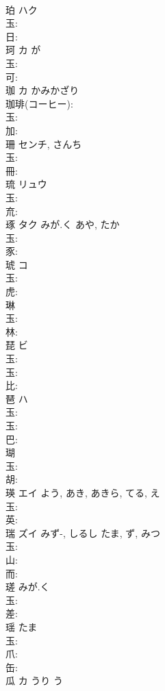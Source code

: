 \documentclass[8pt]{extreport}
\begin{document}
\begin{CJK}{UTF8}{min}
\\	珀	ハク			
\\	玉: 
\\	日: 
\\	珂	カ		が	
\\	玉: 
\\	可: 
\\	珈	カ	かみかざり		
\\	珈琲(コーヒー): 
\\	玉: 
\\	加: 
\\	珊		センチ, さんち			
\\	玉: 
\\	冊: 
\\	琉	リュウ			
\\	玉: 
\\	㐬: 
\\	琢	タク	みが.く	あや, たか	
\\	玉: 
\\	豕: 
\\	琥	コ			
\\	玉: 
\\	虎: 
\\	琳					
\\	玉: 
\\	林: 
\\	琵	ビ			
\\	玉: 
\\	玉: 
\\	比: 
\\	琶	ハ			
\\	玉: 
\\	玉: 
\\	巴: 
\\	瑚					
\\	玉: 
\\	胡: 
\\	瑛	エイ		よう, あき, あきら, てる, え	
\\	玉: 
\\	英: 
\\	瑞	ズイ	みず-, しるし	たま, ず, みつ	
\\	玉: 
\\	山: 
\\	而: 
\\	瑳		みが.く			
\\	玉: 
\\	差: 
\\	瑶		たま			
\\	玉: 
\\	爪: 
\\	缶: 
\\	瓜	カ	うり	う	

\end{CJK}
\end{document}
